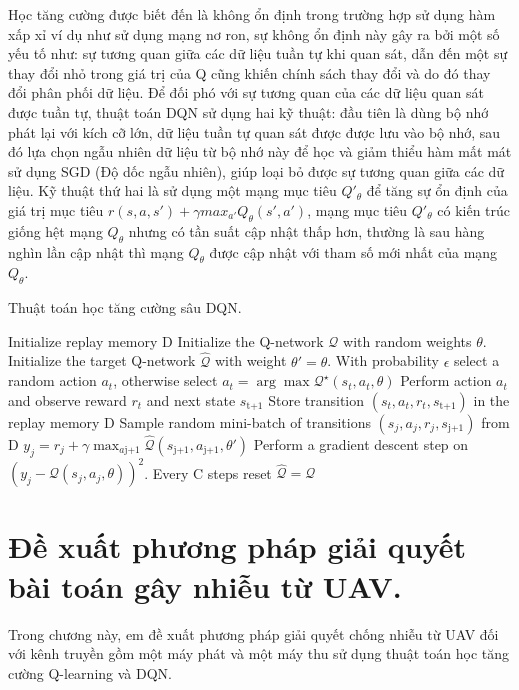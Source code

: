 \documentclass{uetgraduation}
\begin{document}
Học tăng cường được biết đến là không ổn định trong trường hợp sử dụng hàm xấp xỉ ví dụ như sử dụng mạng nơ ron, sự không ổn định này gây ra bởi một số yếu tố như:
sự tương quan giữa các dữ liệu tuần tự khi quan sát, dẫn đến một sự thay đổi nhỏ trong giá trị của Q cũng khiến chính sách thay đổi và do đó thay đổi phân phối dữ liệu. Để đối phó với sự
tương quan của các dữ liệu quan sát được tuần tự, thuật toán DQN sử dụng hai kỹ thuật: đầu tiên là dùng bộ nhớ phát lại với kích cỡ lớn, dữ liệu tuần tự quan sát được được lưu vào bộ nhớ, sau đó lựa chọn
ngẫu nhiên dữ liệu từ bộ nhớ này để học và giảm thiểu hàm mất mát sử dụng SGD (Độ dốc ngẫu nhiên), giúp loại bỏ được sự tương quan giữa các dữ liệu. Kỹ thuật thứ hai là
sử dụng một mạng mục tiêu $Q'_\theta$ để tăng sự ổn định của giá trị mục tiêu $r(s, a, s') + \gamma max_{a'} Q_\theta (s', a')$, mạng mục tiêu $Q'_\theta$ có kiến trúc giống hệt mạng
$Q_\theta$ nhưng có tần suất cập nhật thấp hơn, thường là sau hàng nghìn lần cập nhật thì mạng $Q_\theta$ được cập nhật với tham số mới nhất của mạng $Q_\theta$.
\begin{algorithm}
    \caption{Thuật toán học tăng cường sâu DQN.}\label{alg:dqn_2}
    \begin{algorithmic}[1]
    \State Initialize replay memory D
    \State Initialize the Q-network $\mathcal{Q}$ with random weights $\theta$.
    \State Initialize the target Q-network $\hat{\mathcal{Q}}$ with weight $\theta' = \theta$.
        \State With probability $\epsilon$ select a random action $a_t$, otherwise select $a_t = \arg \max \mathcal{Q}^\star (s_t, a_t, \theta)$
        \State Perform action $a_t$ and observe reward $r_t$ and next state $s_\text{t+1}$
        \State Store transition $(s_t,a_t,r_t,s_\text{t+1})$ in the replay memory D
        \State Sample random mini-batch of transitions $(s_j,a_j,r_j,s_\text{j+1})$ from D
        \State $y_j = r_j + \gamma \max_{a\text{j+1}} \hat{\mathcal{Q}} (s_\text{j+1}, a_\text{j+1}, \theta')$
        \State Perform a gradient descent step on $(y_j - \mathcal{Q} (s_j, a_j, \theta))^2$.
        \State Every C steps reset $\hat{\mathcal{Q}} = \mathcal{Q}$
    \EndFor
\end{algorithmic}
\end{algorithm}

\chapter{Đề xuất phương pháp giải quyết bài toán gây nhiễu từ UAV.}
Trong chương này, em đề xuất phương pháp giải quyết chống nhiễu từ UAV đối với kênh truyền gồm một máy phát và một máy thu sử dụng thuật toán học tăng cường Q-learning và DQN.
\end{document}
